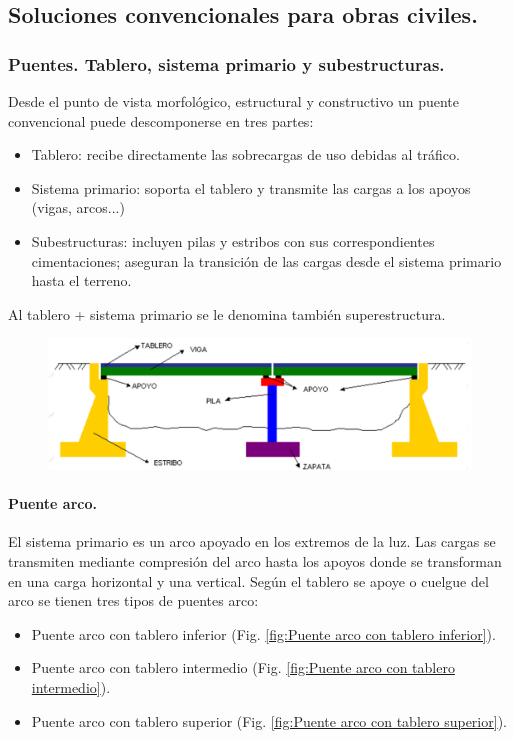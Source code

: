 \subsection{Soluciones convencionales para obras civiles.}
\subsubsection{Puentes. Tablero, sistema primario y subestructuras.}
Desde el punto de vista morfológico, estructural y constructivo un puente convencional puede descomponerse en tres partes:
\begin{itemize}
    \item Tablero: recibe directamente las sobrecargas de uso debidas al tráfico.
    \item Sistema primario: soporta el tablero y transmite las cargas a los apoyos (vigas, arcos...)
    \item Subestructuras: incluyen pilas y estribos con sus correspondientes cimentaciones; aseguran la transición de las cargas desde el sistema primario hasta el terreno.
\end{itemize}
Al tablero + sistema primario se le denomina también superestructura.

\begin{figure}[H]
    \centering
    \includegraphics[width=1\linewidth]{Imagenes/Puentes.png}
\end{figure}

\paragraph{Puente arco.}
El sistema primario es un arco apoyado en los extremos de la luz. Las cargas se transmiten mediante compresión del arco hasta los apoyos donde se transforman en una carga horizontal y una vertical. Según el tablero se apoye o cuelgue del arco se tienen tres tipos de puentes arco:
\begin{itemize}
    \item Puente arco con tablero inferior (Fig. \ref{fig:Puente arco con tablero inferior}). 
    \item Puente arco con tablero intermedio (Fig. \ref{fig:Puente arco con tablero intermedio}).
    \item Puente arco con tablero superior (Fig. \ref{fig:Puente arco con tablero superior}).
\end{itemize}

